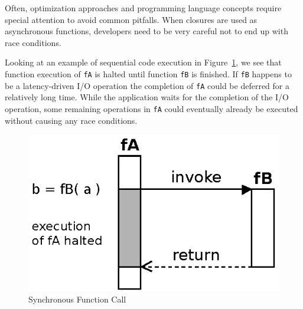 
Often, optimization approaches and programming language concepts require special attention to avoid common pitfalls.
When closures are used as asynchronous functions, developers need to be very careful not to end up with race conditions.


Looking at an example of sequential code execution in Figure~\ref{fig:Closures_Synchronous}, we see that function execution of \texttt{fA} is halted until function \texttt{fB} is finished.
If \texttt{fB} happens to be a latency-driven I/O operation the completion of \texttt{fA} could be deferred for a relatively long time.
While the application waits for the completion of the I/O operation, some remaining operations in \texttt{fA} could eventually already be executed without causing any race conditions.
\begin{figure}[!ht]
	\centering
  \includegraphics{figures/Closures_Synchronous}
	\caption{Synchronous Function Call}
	\label{fig:Closures_Synchronous}
\end{figure}


